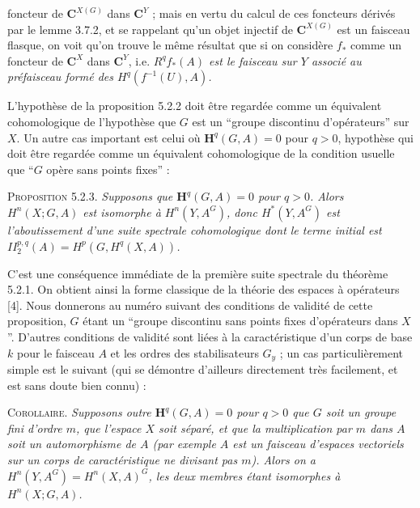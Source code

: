 \clearpage
{}

\noindent foncteur de ${\mathbf C}^{X(G)}$ dans ${\mathbf C}^Y$ ; mais en vertu du calcul de ces
foncteurs dérivés par le lemme 3.7.2, et se rappelant qu'un objet injectif de
${\mathbf C}^{X(G)}$ est un faisceau flasque, on voit qu'on trouve le même résultat que
si on considère $f_*$ comme un foncteur de ${\mathbf C}^X$ dans ${\mathbf C}^Y$, i.e.
\textit{$R^qf_*(A)$ est le faisceau sur $Y$ associé au préfaisceau formé des
$H^q(f^{-1}(U),A)$.}

L'hypothèse de la proposition 5.2.2 doit être regardée comme un équivalent
cohomologique de l'hypothèse que $G$ est un ``groupe discontinu d'opérateurs''
sur $X$. Un autre cas important est celui où $\mathbf H^q(G,A)=0$ pour $q>0$,
hypothèse qui doit être regardée comme un équivalent cohomologique de la
condition usuelle que ``$G$ opère sans points fixes'' :

\textsc{Proposition 5.2.3.} \textit{Supposons que
$\mathbf H^q(G,A)=0$ pour $q>0$. Alors $H^n(X;G,A)$ est isomorphe à
$H^n(Y,A^G)$, donc $H^*(Y,A^G)$ est l'aboutissement d'une suite spectrale
cohomologique dont le terme initial est
$II_2^{p,q}(A)=H^p(G,H^q(X,A))$.}

C'est une conséquence immédiate de la première suite spectrale du théorème
5.2.1.
On obtient ainsi la forme classique de la théorie des espaces à opérateurs
[4]. Nous donnerons au numéro suivant des conditions de validité de cette
proposition, $G$ étant un ``groupe discontinu sans points fixes d'opérateurs
dans $X$''. D'autres conditions de validité sont liées à la caractéristique
d'un corps de base $k$ pour le faisceau $A$ et les ordres des stabilisateurs
$G_y$ ; un cas particulièrement simple est le suivant (qui se démontre
d'ailleurs directement très facilement, et est sans doute bien connu) :

\textsc{Corollaire.} \textit{Supposons outre $\mathbf H^q(G,A)=0$
pour $q>0$ que $G$ soit un groupe fini d'ordre $m$, que l'espace $X$ soit
séparé, et que la multiplication par $m$ dans $A$ soit un automorphisme de
$A$ (par exemple $A$ est un faisceau d'espaces vectoriels sur un corps de
caractéristique ne divisant pas $m$). Alors on a
$H^n(Y,A^G)=H^n(X,A)^G$, les deux membres étant isomorphes à
$H^n(X;G,A)$.}

